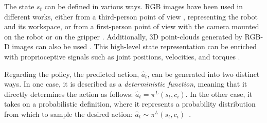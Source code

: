 The state $s_{t}$ can be defined in various ways. RGB images have been used in different works, either from a third-person point of view \cite{james2018task_embedded}, representing the robot and its workspace, or from a first-person point of view with the camera mounted on the robot \cite{jang2022bc_z} or on the gripper \cite{mees2022calvin}. Additionally, 3D point-clouds generated by RGB-D images can also be used \cite{shridhar2023perceiver}. This high-level state representation can be enriched with proprioceptive signals such as joint positions, velocities, and torques \cite{zhang2018deep_vr_teleoperation}.

Regarding the policy, the predicted action, $\hat{a}_{t}$, can be generated into two distinct ways. In one case, it is described as a \textit{deterministic function}, meaning that it directly determines the action as follows: $\hat{a}_{t} = \pi^{L}(s_{t}, c_{i})$\cite{jang2022bc_z}. In the other case, it takes on a probabilistic definition, where it represents a probability distribution from which to sample the desired action: $\hat{a}_{t} \sim \pi^{L}(s_{t}, c_{i})$~\cite{mandi2022towards_more_generalizable_one_shot}.

